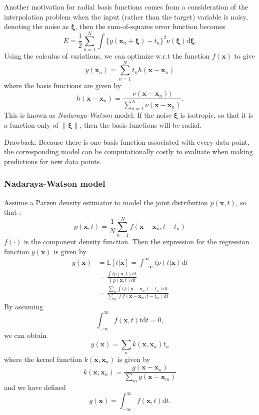 \documentclass[a4paper]{book}
\newcommand{\mbf}{\mathbf}
\newcommand{\ud}{\mathrm{d}}
\newcommand{\xx}{\mbf x}
\newcommand{\Exp}{\mathbb{E}}
\begin{document}
Another motivation for radial basis functions comes from a consideration of the interpolation problem when the input (rather than the target) variable is noisy, denoting the noise as $\bm \xi$, then the sum-of-squares error function becomes
\begin{equation}\label{}
  E=\frac12\sum_{n=1}^{N}\int \{y(\xx_n+\bm\xi)-t_n\}^2\nu(\bm\xi)\ud\bm\xi.
\end{equation}
Using the calculus of variations, we can optimize w.r.t the function $f(\xx)$ to give
\begin{equation}\label{}
  y(\xx_n)=\sum_{n=1}^{N}t_nh(\xx-\xx_n)
\end{equation}
where the basis functions are given by
\begin{equation}\label{}
  h(\xx-\xx_n) = \frac{\nu(\xx-\xx_n))}{\sum_{n=1}^{N}\nu(\xx-\xx_n)}.
\end{equation}
This is known as \textit{Nadaraya-Watson} model. If the noise $\bm \xi$ is isotropic, so that it is a function only of $\|\bm\xi\|$, then the basis functions will be radial.

Drawback: Because there is one basis function associated with every data point, the corresponding model can be computationally costly to evaluate when making predictions for new data points.
\subsubsection*{ Nadaraya-Watson model}
Assume a Parzen density estimator to model the joint distribution $p(\xx, t) $, so that :
\begin{equation}
p(\xx,t) = \frac1N\sum_{n=1}^{N}f(\xx-\xx_n,t-t_n)
\end{equation}
$f(\cdot)$ is the component density function. Then the expression for the regression function $y(\xx)$ is given by
\begin{align}\label{}
  y(\xx) & =\Exp[t|\xx] =\int_{-\infty}^\infty tp(t|\xx)\ud t \\
   & =\frac{\int tp(\xx,t)\ud t}{\int p(\xx,t)\ud t} \\
   & = \frac{\sum_n \int tf(\xx-\xx_n,t-t_n)\ud t}{\sum_m \int f(\xx-\xx_m,t-t_m)\ud t}
\end{align}
By assuming
\begin{equation}\label{}
  \int_{-\infty}^{\infty}f(\xx,t)t\ud t = 0,
\end{equation}
we can obtain
\begin{equation}
y(\xx) = \sum_nk(\xx,\xx_n)t_n
\end{equation}
where the kernel function $k(\xx,\xx_n)$ is given by
\begin{equation}\label{}
  k(\xx,\xx_n) = \frac{g(\xx-\xx_n)}{\sum_m g(\xx-\xx_m)}
\end{equation}
and we have defined
\begin{equation}\label{}
  g(\xx) = \int_{-\infty}^{\infty}f(\xx,t)\ud t.
\end{equation}
\end{document}
